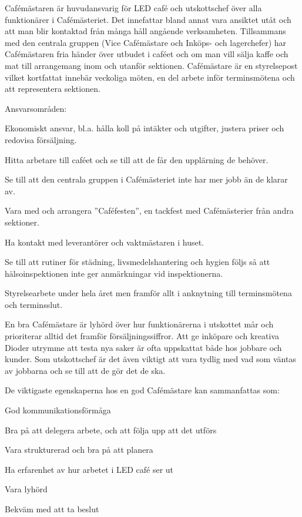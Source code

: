 \documentclass[10pt]{article}
\def\post{Cafémästare}
\def\doctitle{Kravprofil för \post}
\begin{document}
\heading{\doctitle}


Cafémästaren är huvudansvarig för LED café och utskottschef över alla funktionärer i Cafémästeriet. Det innefattar bland annat vara ansiktet utåt och att man blir kontaktad från många håll angående verksamheten. Tillsammans med den centrala gruppen (Vice Cafémästare och Inköps- och lagerchefer) har Cafémästaren fria händer över utbudet i caféet och om man vill sälja kaffe och mat till arrangemang inom och utanför sektionen. Cafémästare är en styrelsepost vilket kortfattat innebär veckoliga möten, en del arbete inför terminsmötena och att representera sektionen.


Ansvarsområden:
\begin{dashlist}
    \item Ekonomiskt ansvar, bl.a. hålla koll på intäkter och utgifter, justera priser och redovisa försäljning.
    \item Hitta arbetare till caféet och se till att de får den upplärning de behöver.
    \item Se till att den centrala gruppen i Cafémästeriet inte har mer jobb än de klarar av.
    \item Vara med och arrangera ”Caféfesten”, en tackfest med Cafémästerier från andra sektioner.
    \item Ha kontakt med leverantörer och vaktmästaren i huset.
    \item Se till att rutiner för städning, livsmedelshantering och hygien följs så att hälsoinspektionen inte ger anmärkningar vid inspektionerna.
    \item Styrelsearbete under hela året men framför allt i anknytning till terminsmötena och terminsslut.
\end{dashlist}
    
    
En bra Cafémästare är lyhörd över hur funktionärerna i utskottet mår och prioriterar alltid det framför
försäljningssiffror. Att ge inköpare och kreativa Dioder utrymme att testa nya saker är ofta uppskattat
både hos jobbare och kunder. Som utskottschef är det även viktigt att vara tydlig med vad som väntas
av jobbarna och se till att de gör det de ska.


De viktigaste egenskaperna hos en god {\post} kan sammanfattas som:
\begin{dashlist}
    \item God kommunikationsförmåga
    \item Bra på att delegera arbete, och att följa upp att det utförs
    \item Vara strukturerad och bra på att planera
    \item Ha erfarenhet av hur arbetet i LED café ser ut
    \item Vara lyhörd
    \item Bekväm med att ta beslut
\end{dashlist}
\end{document}
